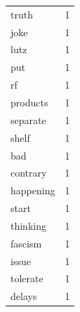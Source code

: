 \begin{tabular}{lr}
truth & 1 \\
joke & 1 \\
lutz & 1 \\
put & 1 \\
rf & 1 \\
products & 1 \\
separate & 1 \\
shelf & 1 \\
bad & 1 \\
contrary & 1 \\
happening & 1 \\
start & 1 \\
thinking & 1 \\
fascism & 1 \\
issue & 1 \\
tolerate & 1 \\
delays & 1 \\
\bottomrule
\end{tabular}
